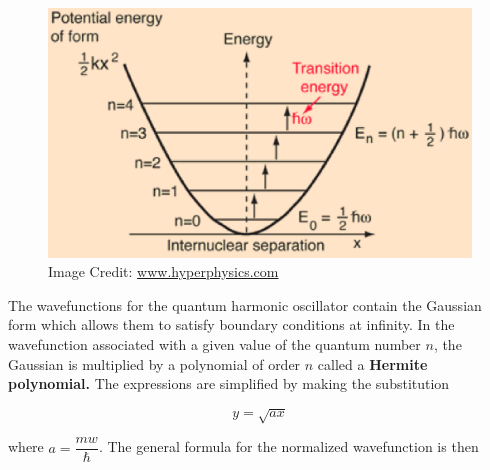 \documentclass{article}
\begin{document}
\begin{figure}[ht]
\begin{center}
\includegraphics[scale=.6]{potwell.eps}
\caption{\label{fig:energy}Image Credit: \url{www.hyperphysics.com}}
\end{center}
\end{figure}
\clearpage
The wavefunctions for the quantum harmonic oscillator contain the Gaussian form which allows them to satisfy boundary conditions at infinity. In the wavefunction associated with a given value of the quantum number $n$, the Gaussian is multiplied by a polynomial of order $n$ called a \textbf{Hermite polynomial.}  The expressions are simplified by making the substitution

\begin{equation}
\label{eq:y}
y= \sqrt{ax}
\end{equation}

where $a = \dfrac{mw}{\hbar}$. The general formula for the normalized wavefunction is then
\end{document}
